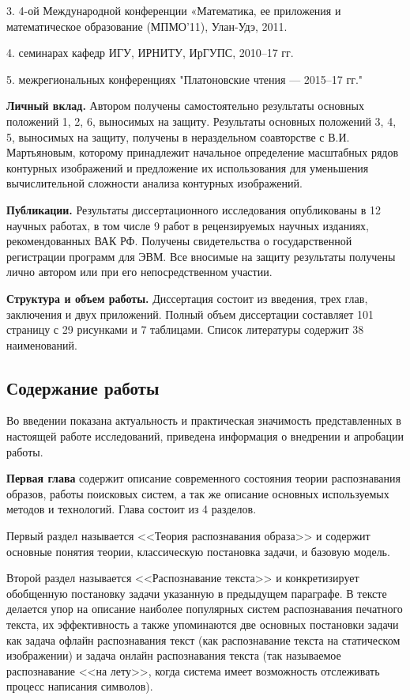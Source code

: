3. 4-ой Международной конференции «Математика, ее приложения и математическое образование (МПМО’11),  Улан-Удэ, 2011.

4. семинарах кафедр ИГУ, ИРНИТУ, ИрГУПС, 2010--17 гг.

5. межрегиональных конференциях "Платоновские чтения --- 2015--17 гг."


\textbf{Личный вклад.} Автором получены самостоятельно результаты основных положений 1, 2, 6,  выносимых  на защиту.  Результаты основных положений 3, 4, 5,  выносимых  на защиту, получены в нераздельном соавторстве с В.И. Мартьяновым, которому принадлежит начальное определение масштабных рядов контурных изображений и предложение их использования для уменьшения вычислительной сложности анализа контурных изображений.

\textbf{Публикации.} Результаты диссертационного исследования
опубликованы в 12 научных работах, в том числе 9 работ в рецензируемых научных изданиях, рекомендованных ВАК РФ. Получены свидетельства о государственной регистрации программ для ЭВМ.
Все вносимые на защиту результаты получены лично автором или при его непосредственном участии.

\textbf{Структура и объем работы.} Диссертация состоит из введения, трех глав, заключения и двух приложений. Полный объем диссертации составляет 101 страницу с 29 рисунками и 7 таблицами. Список литературы содержит 38 наименований.

\subsection*{\Large Содержание работы}
Во введении показана актуальность и практическая значимость представленных в настоящей работе исследований, приведена информация о внедрении и апробации работы.

\textbf{Первая глава} содержит описание современного состояния теории распознавания образов, работы поисковых систем, а так же описание основных используемых методов и технологий. Глава состоит из 4 разделов. 

Первый раздел называется <<Теория распознавания образа>> и содержит основные понятия теории,  классическую постановка задачи, и базовую модель.

Второй раздел называется <<Распознавание текста>> и конкретизирует обобщенную постановку задачи указанную в предыдущем параграфе. В тексте делается упор на описание наиболее популярных систем распознавания печатного текста, их эффективность а также упоминаются две основных постановки задачи как задача офлайн распознавания текст (как распознавание текста на статическом изображении) и задача онлайн распознавания текста (так называемое распознавание <<на лету>>, когда система имеет возможность отслеживать процесс написания символов).

